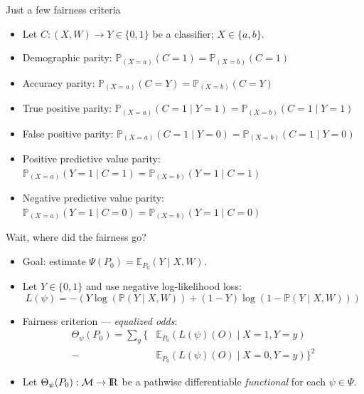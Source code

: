 \documentclass[12pt,t]{beamer}
\newcommand{\E}{\mathbb{E}}
\newcommand{\pr}{\mathbb{P}}
\newcommand{\openr}{\hbox{${\rm I\kern-.2em R}$}}
\begin{document}

\begin{frame}[c]{Just a few fairness criteria}

\begin{center}
\begin{itemize}
  \itemsep8pt
  \item Let $C: (X, W) \to Y \in \{0, 1\}$ be a classifier; $X \in \{a, b\}$.
  \item Demographic parity: $\pr_{(X = a)}(C = 1) = \pr_{(X = b)}(C = 1)$
  \item Accuracy parity: $\pr_{(X = a)}(C = Y) = \pr_{(X = b)}(C = Y)$
  \item True positive parity: $\pr_{(X = a)}(C = 1 \mid Y = 1) =
    \pr_{(X = b)}(C = 1 \mid Y = 1)$
  \item False positive parity: $\pr_{(X = a)}(C = 1 \mid Y = 0) =
    \pr_{(X = b)}(C = 1 \mid Y = 0)$
  \item Positive predictive value parity: $\pr_{(X = a)}(Y = 1 \mid C = 1) =
    \pr_{(X = b)}(Y = 1 \mid C = 1)$
  \item Negative predictive value parity: $\pr_{(X = a)}(Y = 1 \mid C = 0) =
    \pr_{(X = b)}(Y = 1 \mid C = 0)$
\end{itemize}
\end{center}


\end{frame}


\begin{frame}[c]{Wait, where did the fairness go?}

\begin{center}
\begin{itemize}
  \itemsep12pt
  \item Goal: estimate $\Psi(P_0) = \E_{P_0}(Y \mid X, W)$.
  \item Let $Y \in \{0, 1\}$ and use negative log-likelihood loss:
    $$L(\psi) = -(Y \log(\pr(Y \mid X, W)) + (1 - Y) \log(1 -
    \pr(Y \mid X, W)))$$
  \item Fairness criterion --- \textit{equalized odds}:
    $$\begin{aligned}
      \Theta_{\psi}(P_0) = \sum_y \{&\E_{P_0}(L(\psi)(O) \mid X = 1, Y = y) \\ -
      &\E_{P_0}(L(\psi)(O) \mid X = 0, Y = y)\}^2
    \end{aligned}$$
  \item Let $\Theta_{\psi}(P_0): \mathcal{M} \rightarrow \openr$ be a pathwise
    differentiable \textit{functional} for each $\psi \in \Psi$.
\end{itemize}
\end{center}


\end{frame}
\end{document}
